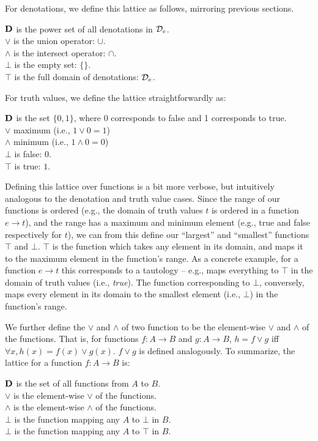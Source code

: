 For denotations, we define this lattice as follows, mirroring previous sections.
\begin{lquote}
$\mathbf{D}$ is the power set of all denotations in $\mathcal{D}_e$. \\
$\lor$ is the union operator: $\cup$. \\
$\land$ is the intersect operator: $\cap$. \\
$\bot$ is the empty set: $\{\}$. \\
$\top$ is the full domain of denotations: $\mathcal{D}_e$.
\end{lquote}

For truth values, we define the lattice straightforwardly as:
\begin{lquote}
$\mathbf{D}$ is the set $\{0, 1\}$, where 0 corresponds to false and 1 corresponds to true. \\
$\lor$ maximum (i.e., $1 \lor 0 = 1$) \\
$\land$ minimum (i.e., $1 \land 0 = 0$) \\
$\bot$ is false: $0$. \\
$\top$ is true: $1$.
\end{lquote}


Defining this lattice over functions is a bit more verbose, but intuitively analogous
  to the denotation and truth value cases.
Since the range of our functions is ordered (e.g., the domain of truth values $t$ is ordered
  in a function $e \rightarrow t$),
  and the range has a maximum and minimum element (e.g., true and false respectively for $t$),
  we can from this define our ``largest'' and ``smallest'' functions $\top$ and $\bot$.
$\top$ is the function which takes any element in its domain, and maps it to
  the maximum element in the function's range.
As a concrete example, for a function $e \rightarrow t$ this corresponds to a tautology --
  e.g.,  maps everything to $\top$ in the domain of truth values
  (i.e., \textit{true}).
The function corresponding to $\bot$, conversely, maps every element in its domain 
  to the smallest element (i.e., $\bot$) in the function's range.

We further define the $\lor$ and $\land$ of two function to be the element-wise $\lor$
  and $\land$ of the functions.
That is, for functions $f:A \rightarrow B$ and $g:A \rightarrow B$, 
  $h = f \lor g$ iff $\forall x, h(x) = f(x) \lor g(x)$.
$f \lor g$ is defined analogously.
To summarize, the lattice for a function $f:A \rightarrow B$ is:

\begin{lquote}
$\mathbf{D}$ is the set of all functions from $A$ to $B$. \\
$\lor$ is the element-wise $\lor$ of the functions. \\
$\land$ is the element-wise $\land$ of the functions. \\
$\bot$ is the function mapping any $A$ to $\bot$ in $B$. \\
$\bot$ is the function mapping any $A$ to $\top$ in $B$. \\
\end{lquote}



